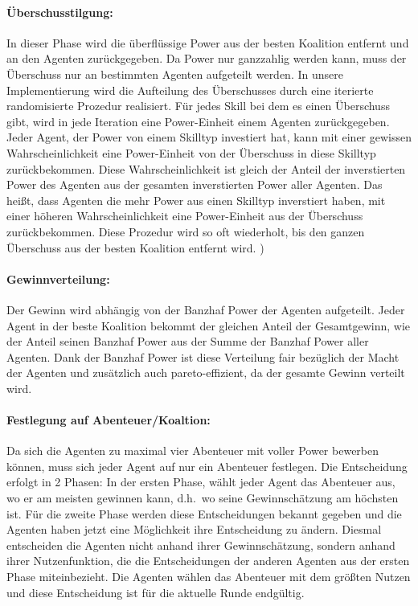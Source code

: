\documentclass[fleqn,10pt]{SelfArx} %
\begin{document}
\paragraph{Überschusstilgung:} 
In dieser Phase wird die überflüssige Power aus der besten Koalition entfernt und an den Agenten zurückgegeben. Da Power nur ganzzahlig werden kann, muss der Überschuss nur an bestimmten Agenten aufgeteilt werden. In unsere Implementierung wird die Aufteilung des Überschusses durch eine iterierte randomisierte Prozedur realisiert. Für jedes Skill bei dem es einen Überschuss gibt, wird in jede Iteration eine Power-Einheit einem Agenten zurückgegeben. Jeder Agent, der Power von einem Skilltyp investiert hat, kann mit einer gewissen Wahrscheinlichkeit eine Power-Einheit von der Überschuss in diese Skilltyp zurückbekommen. Diese Wahrscheinlichkeit ist gleich der Anteil der inverstierten Power des Agenten aus der gesamten inverstierten Power aller Agenten. Das heißt, dass Agenten die mehr Power aus einen Skilltyp inverstiert haben, mit einer höheren Wahrscheinlichkeit eine Power-Einheit aus der Überschuss zurückbekommen. Diese Prozedur wird so oft wiederholt, bis den ganzen Überschuss aus der besten Koalition entfernt wird.
)
\paragraph{Gewinnverteilung:}
Der Gewinn wird abhängig von der Banzhaf Power der Agenten aufgeteilt. Jeder Agent in der beste Koalition bekommt der gleichen Anteil der Gesamtgewinn, wie der Anteil seinen Banzhaf Power aus der Summe der Banzhaf Power aller Agenten. Dank der Banzhaf Power ist diese Verteilung fair bezüglich der Macht der Agenten und zusätzlich auch pareto-effizient, da der gesamte Gewinn verteilt wird.

\paragraph{Festlegung auf Abenteuer/Koaltion:}
Da sich die Agenten zu maximal vier Abenteuer mit voller Power bewerben können, muss sich jeder Agent auf nur ein Abenteuer festlegen. Die Entscheidung erfolgt in 2 Phasen: In der ersten Phase, wählt jeder Agent das Abenteuer aus, wo er am meisten gewinnen kann, d.h.\ wo seine Gewinnschätzung am höchsten ist. Für die zweite Phase werden diese Entscheidungen bekannt gegeben und die Agenten haben jetzt eine Möglichkeit ihre Entscheidung zu ändern. Diesmal entscheiden die Agenten nicht anhand ihrer Gewinnschätzung, sondern anhand ihrer Nutzenfunktion, die die Entscheidungen der anderen Agenten aus der ersten Phase miteinbezieht. Die Agenten wählen das Abenteuer mit dem größten Nutzen und diese Entscheidung ist für die aktuelle Runde endgültig.
\end{document}
